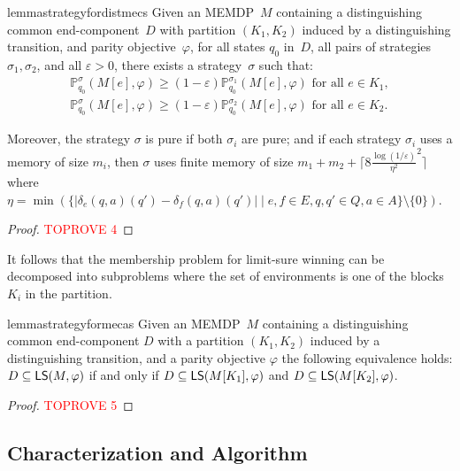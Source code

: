 \documentclass[a4paper,USenglish,cleveref, autoref, thm-restate]{lipics-v2021}
\let\epsilon\varepsilon
\def\abs#1{\ensuremath{\lvert #1 \rvert}}
\newcommand*{\pr}{\mathbb{P}}
\newcommand\limitsure{\textrm{\sf LS}}
\def\Act{A}
\begin{document}
\begin{restatable}{lemma}{strategyfordistmecs}
  \label{lemma:strategy-for-dist-mecs}
  Given an MEMDP~$M$ containing a distinguishing common end-component~$D$ with partition $(K_1,K_2)$
  induced by a distinguishing transition, and parity objective~$\varphi$,
	for all states $q_0$ in~$D$, all pairs of strategies $\sigma_1,\sigma_2$, and all $\epsilon>0$, there exists 
	a strategy~$\sigma$ such that:
  \begin{align*}
		\pr_{q_0}^{\sigma}(M[e], \varphi) \geq (1-\epsilon)\pr_{q_0}^{\sigma_1}(M[e], \varphi) \text{ for all } e \in K_1,\\
		\pr_{q_0}^{\sigma}(M[e], \varphi) \geq (1-\epsilon)\pr_{q_0}^{\sigma_2}(M[e], \varphi) \text{ for all } e \in K_2.
	\end{align*}
	
    Moreover, the strategy $\sigma$ is pure if both $\sigma_i$ are pure; and if each strategy $\sigma_i$ uses a memory of size $m_i$,
	then $\sigma$ uses finite memory of size $m_1+m_2+\lceil 8\frac{\log(1/\epsilon)}{\eta^2}^2\rceil$ where \linebreak $\eta=\min\left(\{\abs{\delta_e(q,a)(q') - \delta_{f}(q,a)(q')} \mid e,f \in E, q,q'\in Q, a \in \Act\}\setminus\{0\}\right)$.
\end{restatable}


\begin{proof}\textcolor{red}{TOPROVE 4}\end{proof}


It follows that the membership problem for limit-sure winning can be decomposed into subproblems where the set of environments is one of the blocks $K_i$ in the partition.

\begin{restatable}{lemma}{strategyformecas}
  \label{lemma:strategy-for-mec-as}
  Given an MEMDP~$M$ containing a distinguishing common end-component $D$ with a partition $(K_1,K_2)$
  induced by a distinguishing transition, and a parity objective $\varphi$ the following equivalence holds:
  $D \subseteq \limitsure(M,\varphi)$ if and only if $D \subseteq \limitsure(M[K_1],\varphi)$ and 
  $D \subseteq \limitsure(M[K_2],\varphi)$. 
\end{restatable}


\begin{proof}\textcolor{red}{TOPROVE 5}\end{proof}


\subsection{Characterization and Algorithm}
\end{document}
